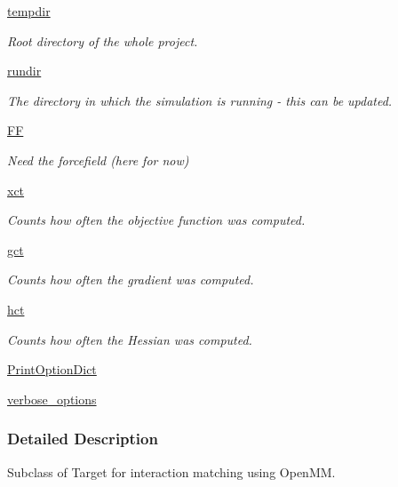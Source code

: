 \begin{DoxyCompactItemize}
\item 
\hyperlink{classforcebalance_1_1target_1_1Target_aa1f01b5b78db253b5b66384ed11ed193}{tempdir}
\begin{DoxyCompactList}\small\item\em Root directory of the whole project. \end{DoxyCompactList}\item 
\hyperlink{classforcebalance_1_1target_1_1Target_a6872de5b2d4273b82336ea5b0da29c9e}{rundir}
\begin{DoxyCompactList}\small\item\em The directory in which the simulation is running -\/ this can be updated. \end{DoxyCompactList}\item 
\hyperlink{classforcebalance_1_1target_1_1Target_a38a37919783141ea37fdcf8b00ce0aaf}{F\-F}
\begin{DoxyCompactList}\small\item\em Need the forcefield (here for now) \end{DoxyCompactList}\item 
\hyperlink{classforcebalance_1_1target_1_1Target_aad2e385cfbf7b4a68f1c2cb41133fe82}{xct}
\begin{DoxyCompactList}\small\item\em Counts how often the objective function was computed. \end{DoxyCompactList}\item 
\hyperlink{classforcebalance_1_1target_1_1Target_aa625ac88c6744eb14ef281d9496d0dbb}{gct}
\begin{DoxyCompactList}\small\item\em Counts how often the gradient was computed. \end{DoxyCompactList}\item 
\hyperlink{classforcebalance_1_1target_1_1Target_a5b5a42f78052b47f29ed4b940c6111a1}{hct}
\begin{DoxyCompactList}\small\item\em Counts how often the Hessian was computed. \end{DoxyCompactList}\item 
\hyperlink{classforcebalance_1_1BaseClass_afc6659278497d7245bc492ecf405ccae}{Print\-Option\-Dict}
\item 
\hyperlink{classforcebalance_1_1BaseClass_afd68efa29ccd2f320f4cf82198214aac}{verbose\-\_\-options}
\end{DoxyCompactItemize}


\subsubsection{Detailed Description}
Subclass of Target for interaction matching using Open\-M\-M. 



